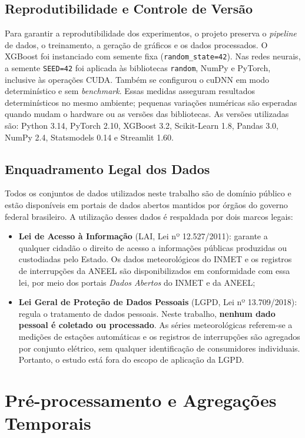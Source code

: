\subsection{Reprodutibilidade e Controle de Versão}\label{sec:reprodutibilidade}
Para garantir a reprodutibilidade dos experimentos, o projeto preserva o \textit{pipeline} de dados, o treinamento, a geração de gráficos e os dados processados. O XGBoost foi instanciado com semente fixa (\texttt{random\_state=42}). Nas redes neurais, a semente \texttt{SEED=42} foi aplicada às bibliotecas \texttt{random}, NumPy e PyTorch, inclusive às operações CUDA. Também se configurou o cuDNN em modo determinístico e sem \textit{benchmark}. Essas medidas asseguram resultados determinísticos no mesmo ambiente; pequenas variações numéricas são esperadas quando mudam o hardware ou as versões das bibliotecas. As versões utilizadas são: Python 3.14, PyTorch 2.10, XGBoost 3.2, Scikit-Learn 1.8, Pandas 3.0, NumPy 2.4, Statsmodels 0.14 e Streamlit 1.60.

\subsection{Enquadramento Legal dos Dados}\label{sec:legal}
Todos os conjuntos de dados utilizados neste trabalho são de domínio público e estão disponíveis em portais de dados abertos mantidos por órgãos do governo federal brasileiro. A utilização desses dados é respaldada por dois marcos legais:

\begin{itemize}
    \item \textbf{Lei de Acesso à Informação} (LAI, Lei nº 12.527/2011): garante a qualquer cidadão o direito de acesso a informações públicas produzidas ou custodiadas pelo Estado. Os dados meteorológicos do INMET e os registros de interrupções da ANEEL são disponibilizados em conformidade com essa lei, por meio dos portais \textit{Dados Abertos} do INMET e da ANEEL;
    \item \textbf{Lei Geral de Proteção de Dados Pessoais} (LGPD, Lei nº 13.709/2018): regula o tratamento de dados pessoais. Neste trabalho, \textbf{nenhum dado pessoal é coletado ou processado}. As séries meteorológicas referem-se a medições de estações automáticas e os registros de interrupções são agregados por conjunto elétrico, sem qualquer identificação de consumidores individuais. Portanto, o estudo está fora do escopo de aplicação da LGPD.
\end{itemize}

\section{Pré-processamento e Agregações Temporais}\label{sec:preprocessamento}

